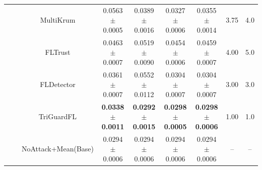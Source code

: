 \begin{table}[t]
\begin{tabular}{c c c c c c c c c}
 &  & MultiKrum & 0.0563$\pm$0.0005 & 0.0389$\pm$0.0016 & 0.0327$\pm$0.0006 & 0.0355$\pm$0.0014 & 3.75 & 4.0 \\
 &  & FLTrust & 0.0463$\pm$0.0007 & 0.0519$\pm$0.0090 & 0.0454$\pm$0.0006 & 0.0459$\pm$0.0007 & 4.00 & 5.0 \\
 &  & FLDetector & 0.0361$\pm$0.0007 & 0.0552$\pm$0.0112 & 0.0304$\pm$0.0007 & 0.0304$\pm$0.0007 & 3.00 & 3.0 \\
 &  & \cellcolor{mygray}TriGuardFL & \cellcolor{mygray}\textbf{0.0338$\pm$0.0011} & \cellcolor{mygray}\textbf{0.0292$\pm$0.0015} & \cellcolor{mygray}\textbf{0.0298$\pm$0.0005} & \cellcolor{mygray}\textbf{0.0298$\pm$0.0006} & \cellcolor{mygray}1.00 & \cellcolor{mygray}1.0 \\
 &  & NoAttack+Mean(Base) & 0.0294$\pm$0.0006 & 0.0294$\pm$0.0006 & 0.0294$\pm$0.0006 & 0.0294$\pm$0.0006 & -- & -- \\
\bottomrule
\end{tabular}
\end{table}
